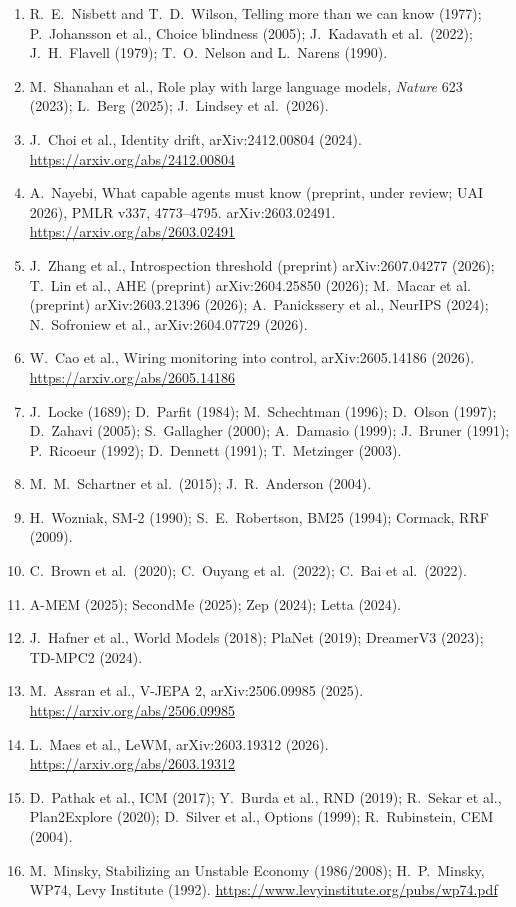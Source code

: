 \documentclass[11pt,a4paper]{article}
\begin{document}
\begin{enumerate}
\item R.~E.~Nisbett and T.~D.~Wilson, Telling more than we can know (1977); P.~Johansson et al., Choice blindness (2005); J.~Kadavath et al.\ (2022); J.~H.~Flavell (1979); T.~O.~Nelson and L.~Narens (1990).
\item M.~Shanahan et al., Role play with large language models, \textit{Nature} 623 (2023); L.~Berg (2025); J.~Lindsey et al.\ (2026).
\item J.~Choi et al., Identity drift, arXiv:2412.00804 (2024). \url{https://arxiv.org/abs/2412.00804}
\item A.~Nayebi, What capable agents must know (preprint, under review; UAI 2026), PMLR v337, 4773--4795. arXiv:2603.02491. \url{https://arxiv.org/abs/2603.02491}
\item J.~Zhang et al., Introspection threshold (preprint) arXiv:2607.04277 (2026); T.~Lin et al., AHE (preprint) arXiv:2604.25850 (2026); M.~Macar et al. (preprint) arXiv:2603.21396 (2026); A.~Panickssery et al., NeurIPS (2024); N.~Sofroniew et al., arXiv:2604.07729 (2026).
\item W.~Cao et al., Wiring monitoring into control, arXiv:2605.14186 (2026). \url{https://arxiv.org/abs/2605.14186}
\item J.~Locke (1689); D.~Parfit (1984); M.~Schechtman (1996); D.~Olson (1997); D.~Zahavi (2005); S.~Gallagher (2000); A.~Damasio (1999); J.~Bruner (1991); P.~Ricoeur (1992); D.~Dennett (1991); T.~Metzinger (2003).
\item M.~M.~Schartner et al.\ (2015); J.~R.~Anderson (2004).
\item H.~Wozniak, SM-2 (1990); S.~E.~Robertson, BM25 (1994); Cormack, RRF (2009).
\item C.~Brown et al.\ (2020); C.~Ouyang et al.\ (2022); C.~Bai et al.\ (2022).
\item A-MEM (2025); SecondMe (2025); Zep (2024); Letta (2024).
\item J.~Hafner et al., World Models (2018); PlaNet (2019); DreamerV3 (2023); TD-MPC2 (2024).
\item M.~Assran et al., V-JEPA 2, arXiv:2506.09985 (2025). \url{https://arxiv.org/abs/2506.09985}
\item L.~Maes et al., LeWM, arXiv:2603.19312 (2026). \url{https://arxiv.org/abs/2603.19312}
\item D.~Pathak et al., ICM (2017); Y.~Burda et al., RND (2019); R.~Sekar et al., Plan2Explore (2020); D.~Silver et al., Options (1999); R.~Rubinstein, CEM (2004).
\item M.~Minsky, Stabilizing an Unstable Economy (1986/2008); H.~P.~Minsky, WP74, Levy Institute (1992). \url{https://www.levyinstitute.org/pubs/wp74.pdf}

\end{enumerate}
\end{document}
